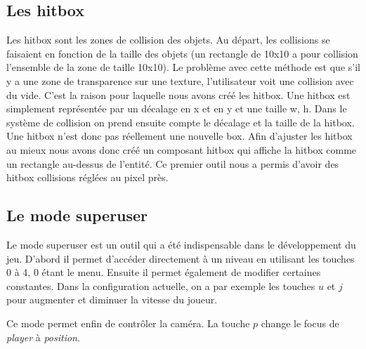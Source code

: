 \documentclass{article}
\begin{document}
\subsection{Les hitbox}
Les hitbox sont les zones de collision des objets. Au départ, les collisions se faisaient en fonction de 
la taille des objets (un rectangle de 10x10 a pour collision l'ensemble de la zone de taille 10x10). Le 
problème avec cette méthode est que s'il y a une zone de transparence sur une texture, l'utilisateur voit 
une collision avec du vide. C'est la raison pour laquelle nous avons créé les hitbox. Une hitbox est 
simplement représentée par un décalage en x et en y et une taille w, h. Dans le système de collision on 
prend ensuite compte le décalage et la taille de la hitbox. Une hitbox n'est donc pas réellement une 
nouvelle box. Afin d'ajuster les hitbox au mieux nous avons donc créé un composant hitbox qui affiche 
la hitbox comme un rectangle au-dessus de l'entité. Ce premier outil nous a permis d'avoir des hitbox 
collisions réglées au pixel près.

\subsection{Le mode superuser}
Le mode superuser est un outil qui a été indispensable dans le développement du jeu. D'abord il permet 
d'accéder directement à un niveau en utilisant les touches 0 à 4, 0 étant le menu. Ensuite il permet 
également de modifier certaines constantes. Dans la configuration actuelle, on a par exemple les 
touches $u$ et $j$ pour augmenter et diminuer la vitesse du joueur.

Ce mode permet enfin de contrôler la caméra. La touche $p$ change le focus de \textit{player} à 
\textit{position}.
\end{document}
